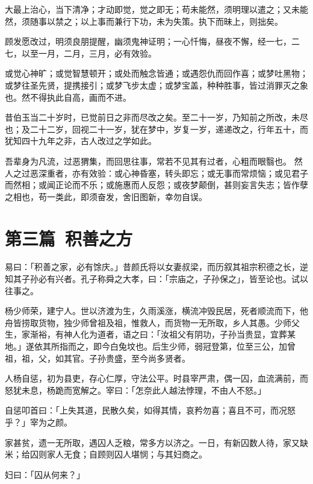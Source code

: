 \documentclass[12pt,twoside,openany]{book}
\begin{document}
大最上治心，当下清净；才动即觉，觉之即无；苟未能然，须明理以遣之；又未能然，须随事以禁之；以上事而兼行下功，未为失策。执下而昧上，则拙矣。

顾发愿改过，明须良朋提醒，幽须鬼神证明；一心忏悔，昼夜不懈，经一七，二七，以至一月，二月，三月，必有效验。

或觉心神旷；或觉智慧顿开；或处而触念皆通；或遇怨仇而回作喜；或梦吐黑物；或梦往圣先贤，提携接引；或梦飞步太虚；或梦宝盖，种种胜事，皆过消罪灭之象也。然不得执此自高，画而不进。

昔伯玉当二十岁时，已觉前日之非而尽改之矣。至二十一岁，乃知前之所改，未尽也；及二十二岁，回视二十一岁，犹在梦中，岁复一岁，递递改之，行年五十，而犹知四十九年之非，古人改过之学如此。

吾辈身为凡流，过恶猬集，而回思往事，常若不见其有过者，心粗而眼翳也。 然人之过恶深重者，亦有效验：或心神昏塞，转头即忘；或无事而常烦恼；或见君子而然相；或闻正论而不乐；或施惠而人反怨；或夜梦颠倒，甚则妄言失志；皆作孽之相也，苟一类此，即须奋发，舍旧图新，幸勿自误。

\chapter{第三篇\ 积善之方}
易曰：「积善之家，必有馀庆。」昔颜氏将以女妻叔梁，而历叙其祖宗积德之长，逆知其子孙必有兴者。孔子称舜之大孝，曰：「宗庙之，子孙保之」，皆至论也。试以往事之。

杨少师荣，建宁人。世以济渡为生，久雨溪涨，横流冲毁民居，死者顺流而下，他舟皆捞取货物，独少师曾祖及祖，惟救人，而货物一无所取，乡人其愚。少师父生，家渐裕，有神人化为道者，语之曰：「汝祖父有阴功，子孙当贵显，宜葬某地。」遂依其所指而之，即今白兔坟也。后生少师，弱冠登第，位至三公，加曾祖，祖，父，如其官。子孙贵盛，至今尚多贤者。

人杨自惩，初为县吏，存心仁厚，守法公平。时县宰严肃，偶一囚，血流满前，而怒犹未息，杨跪而宽解之。宰曰：「怎奈此人越法悖理，不由人不怒。」

自惩叩首曰：「上失其道，民散久矣，如得其情，哀矜勿喜；喜且不可，而况怒乎？」宰为之颜。

家甚贫，遗一无所取，遇囚人乏粮，常多方以济之。一日，有新囚数人待，家又缺米；给囚则家人无食；自顾则囚人堪悯；与其妇商之。

妇曰：「囚从何来？」
\end{document}
